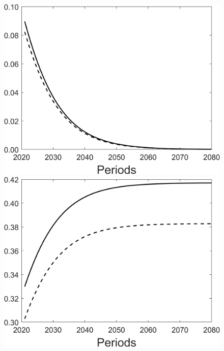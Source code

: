 \begin{figure}[h!!]
\begin{minipage}[]{0.32\textwidth}
	\end{minipage}
	\begin{minipage}[]{0.32\textwidth}
		\includegraphics[width=1\textwidth]{../../codding_model/Own/figures/Rep_agent/staticBAU_LF_separate_Lc_periods59_eppsilon4.00_zeta1.40_Ad08_Ac04_thetac0.70_thetad0.56_HetGrowth1_tauul0.181_util0_withtarget0_lgd0.png}
	\end{minipage}
	\begin{minipage}[]{0.32\textwidth}
		\includegraphics[width=1\textwidth]{../../codding_model/Own/figures/Rep_agent/staticBAU_LF_separate_Ld_periods59_eppsilon4.00_zeta1.40_Ad08_Ac04_thetac0.70_thetad0.56_HetGrowth1_tauul0.181_util0_withtarget0_lgd0.png}

\end{minipage}
\end{figure}
